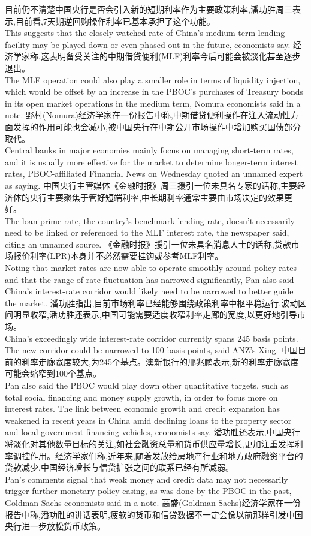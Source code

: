 \documentclass[a4paper,12pt]{article}
\begin{document}
目前仍不清楚中国央行是否会引入新的短期利率作为主要政策利率,潘功胜周三表示,目前看,7天期逆回购操作利率已基本承担了这个功能。
\\This suggests that the closely watched rate of China's medium-term lending facility may be played down or even phased out in the future, economists say.
经济学家称,这表明备受关注的中期借贷便利(MLF)利率今后可能会被淡化甚至逐步退出。
\\The MLF operation could also play a smaller role in terms of liquidity injection, which would be offset by an increase in the PBOC's purchases of Treasury bonds in its open market operations in the medium term, Nomura economists said in a note.
野村(Nomura)经济学家在一份报告中称,中期借贷便利操作在注入流动性方面发挥的作用可能也会减小,被中国央行在中期公开市场操作中增加购买国债部分取代。
\\Central banks in major economies mainly focus on managing short-term rates, and it is usually more effective for the market to determine longer-term interest rates, PBOC-affiliated Financial News on Wednesday quoted an unnamed expert as saying.
中国央行主管媒体《金融时报》周三援引一位未具名专家的话称,主要经济体的央行主要聚焦于管好短端利率,中长期利率通常主要由市场决定的效果更好。
\\The loan prime rate, the country's benchmark lending rate, doesn't necessarily need to be linked or referenced to the MLF interest rate, the newspaper said, citing an unnamed source.
《金融时报》援引一位未具名消息人士的话称,贷款市场报价利率(LPR)本身并不必然需要挂钩或参考MLF利率。
\\Noting that market rates are now able to operate smoothly around policy rates and that the range of rate fluctuation has narrowed significantly, Pan also said China's interest-rate corridor would likely need to be narrowed to better guide the market.
潘功胜指出,目前市场利率已经能够围绕政策利率中枢平稳运行,波动区间明显收窄,潘功胜还表示,中国可能需要适度收窄利率走廊的宽度,以更好地引导市场。
\\China's exceedingly wide interest-rate corridor currently spans 245 basis points. The new corridor could be narrowed to 100 basis points, said ANZ's Xing.
中国目前的利率走廊宽度较大,为245个基点。澳新银行的邢兆鹏表示,新的利率走廊宽度可能会缩窄到100个基点。
\\Pan also said the PBOC would play down other quantitative targets, such as total social financing and money supply growth, in order to focus more on interest rates. The link between economic growth and credit expansion has weakened in recent years in China amid declining loans to the property sector and local government financing vehicles, economists say.
潘功胜还表示,中国央行将淡化对其他数量目标的关注,如社会融资总量和货币供应量增长,更加注重发挥利率调控作用。经济学家们称,近年来,随着发放给房地产行业和地方政府融资平台的贷款减少,中国经济增长与信贷扩张之间的联系已经有所减弱。
\\Pan's comments signal that weak money and credit data may not necessarily trigger further monetary policy easing, as was done by the PBOC in the past, Goldman Sachs economists said in a note.
高盛(Goldman Sachs)经济学家在一份报告中称,潘功胜的讲话表明,疲软的货币和信贷数据不一定会像以前那样引发中国央行进一步放松货币政策。
\end{document}

